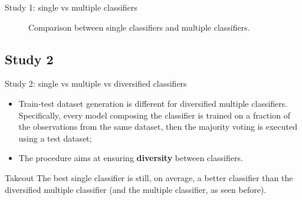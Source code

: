\documentclass[12pt]{beamer}
\begin{document}
\begin{frame}{Study 1: single vs multiple classifiers}
  \begin{figure}
    \centering
    \hfill
    \hfill
    \caption{Comparison between single classifiers and multiple classifiers.}
\end{figure}
\end{frame}


\subsection{Study 2}

\begin{frame}{Study 2: single vs multiple vs diversified classifiers}
  \begin{itemize}
    \item Train-test dataset generation is different for diversified multiple classifiers.
      Specifically, every model composing
      the classifier is trained on a fraction of the observations from the same
      dataset, then the majority
      voting is executed using a test dataset;
    \item The procedure aims at ensuring \textbf{diversity} between classifiers.
  \end{itemize}

  \begin{block}{Takeout}
    The best single classifier is still, on average, a better classifier than
    the diversified multiple classifier (and the multiple classifier, as seen before).
  \end{block}

\end{frame}
\end{document}
